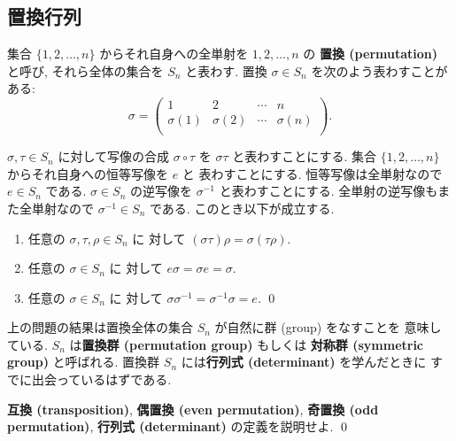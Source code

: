 \documentclass[12pt,twoside]{jarticle}
\begin{document}

\subsection{置換行列}
\label{sec:permutation-matrix}

集合 $\{1,2,\ldots,n\}$ からそれ自身への全単射を $1,2,\ldots,n$ の
{\bf 置換 (permutation)} と呼び, それら全体の集合を $S_n$ と表わす.
置換 $\sigma\in S_n$ を次のよう表わすことがある:
\begin{equation*}
  \sigma = 
  \begin{pmatrix}
    1 & 2 & \cdots & n \\
    \sigma(1) & \sigma(2) & \cdots & \sigma(n) \\
  \end{pmatrix}.
\end{equation*}

\begin{question}
  $\sigma,\tau\in S_n$ に対して写像の合成 $\sigma\circ\tau$ 
  を $\sigma\tau$ と表わすことにする.  
  集合 $\{1,2,\ldots,n\}$ からそれ自身への恒等写像を $e$ と
  表わすことにする. 恒等写像は全単射なので $e\in S_n$ である.
  $\sigma\in S_n$ の逆写像を $\sigma^{-1}$ と表わすことにする.
  全単射の逆写像もまた全単射なので $\sigma^{-1}\in S_n$ である.
  このとき以下が成立する.
  \begin{enumerate}
  \item 任意の $\sigma,\tau,\rho\in S_n$ に
    対して $(\sigma\tau)\rho = \sigma(\tau\rho)$.
  \item 任意の $\sigma\in S_n$ に
    対して $e\sigma = \sigma e = \sigma$.
  \item 任意の $\sigma\in S_n$ に
    対して $\sigma\sigma^{-1} = \sigma^{-1}\sigma = e$.
    \qed
  \end{enumerate}
\end{question}

上の問題の結果は置換全体の集合 $S_n$ が自然に{群 (group)} をなすことを
意味している.  $S_n$ は{\bf 置換群 (permutation group)} もしくは
{\bf 対称群 (symmetric group)} と呼ばれる.
置換群 $S_n$ には{\bf 行列式 (determinant)} を学んだときに
すでに出会っているはずである.

\begin{question}
  \label{q:def-det}
  {\bf 互換 (transposition)},
  {\bf 偶置換 (even permutation)},
  {\bf 奇置換 (odd permutation)}, 
  {\bf 行列式 (determinant)} の定義を説明せよ. \qed
\end{question}
\end{document}
